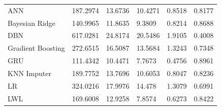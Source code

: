 \documentclass[11pt]{report}
\begin{document}
\begin{table}[H]
\begin{center}
\begin{tabular}{@{}llllll@{}}
		ANN                                & 187.2974                                             & 13.6736                                             & 10.4271                                             & 0.8518                                              & 0.8177                                              \\
		Bayesian Ridge                     & 140.9965                                             & 11.8635                                             & 9.3809                                              & 0.8214                                              & 0.8688                                              \\
		DBN                                & 617.0281                                             & 24.8174                                             & 20.5486                                             & 1.9105                                              & 0.4008                                              \\
		Gradient Boosting                  & 272.6515                                             & 16.5087                                             & 13.5684                                             & 1.3243                                              & 0.7348                                              \\
		GRU                                & 111.4342                                             & 10.4471                                             & 7.7673                                              & 0.4756                                              & 0.8961                                              \\
		KNN Imputer                        & 189.7752                                             & 13.7696                                             & 10.6053                                             & 0.8047                                              & 0.8236                                              \\
		LR                                 & 324.0216                                             & 17.9976                                             & 14.478                                              & 1.3079                                              & 0.6991                                              \\
		LWL                                & 169.6008                                             & 12.9258                                             & 7.8574                                              & 0.6273                                              & 0.8422                                              \\

\end{tabular}
\end{center}
\end{table}
\end{document}
